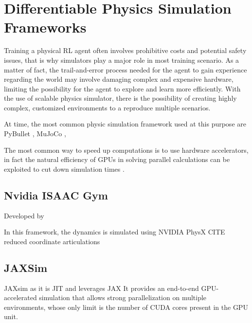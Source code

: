 \chapter{Differentiable Physics Simulation Frameworks}
\label{chp:PhysicsSimulators}

Training a physical \ac{RL} agent often involves prohibitive costs and potential safety issues, that is why simulators play a major role in most training scenario. As a matter of fact, the trail-and-error process needed for the agent to gain experience regarding the world may involve damaging complex and expensive hardware, limiting the possibility for the agent to explore and learn more efficiently.
With the use of scalable physics simulator, there is the possibility of creating highly complex, customized environments to a reproduce multiple scenarios.

At time, the most common physic simulation framework used at this purpose are PyBullet \cite{coumans_pybullet_2016}, MuJoCo \cite{todorov_mujoco_2012},

The most common way to speed up computations is to use hardware accelerators, in fact the natural efficiency of \ac{GPU}s in solving parallel calculations can be exploited to cut down simulation times \cite{liang_gpu-accelerated_2018}.

\section{Nvidia ISAAC Gym}

Developed by \cite{makoviychuk_isaac_2021}

In this framework, the dynamics is simulated using NVIDIA PhysX CITE reduced coordinate articulations

\section{JAXSim}

JAXsim \cite{ferigo_jaxsim_2022} as it is \ac{JIT} and leverages JAX \cite{bradbury_jax_2018}
It provides an end-to-end GPU-accelerated simulation that allows strong parallelization on multiple environments, whose only limit is the number of \ac{CUDA} cores present in the GPU unit.

